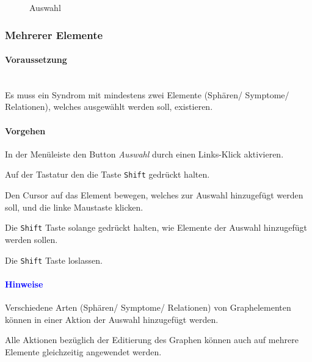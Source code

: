 \documentclass[enabledeprecatedfontcommands,fontsize=11pt,paper=a4,twoside]{scrartcl}
\newcounter{one}
\newcounter{two}[one]
\newcommand*{\hint}{\paragraph{\textcolor{blue}{Hinweise}}}
\newcommand*{\condition}{\paragraph{Voraussetzung}$\;$ \vspace{0.2cm}\\}
\newcommand*{\action}{\paragraph{Vorgehen}}
\let\tempone\itemize
\let\temptwo\enditemize
\renewenvironment{itemize}{\tempone\addtolength{\itemsep}{-10.0pt}}{\temptwo}
\let\origenumerate\enumerate
\let\origendenumerate\endenumerate
\renewenvironment{enumerate}{\origenumerate \addtolength{\itemsep}{-10.0pt}}{\origendenumerate}
\begin{document}
	\begin{figure}[ht!]
		\centering
		\caption{Auswahl}
		
	\end{figure}	

	
	
	\newpage
	\subsubsection{Mehrerer Elemente}
	\condition
	Es muss ein Syndrom mit mindestens zwei Elemente (Sphären/ Symptome/ Relationen), welches ausgewählt werden soll, existieren. 
	\action
	\begin{enumerate}
		\item In der Menüleiste den Button \textit{Auswahl} durch einen Links-Klick aktivieren. 
		\item Auf der Tastatur den die Taste \texttt{Shift} gedrückt halten. 
		\item Den Cursor auf das Element bewegen, welches zur Auswahl hinzugefügt werden soll, und die linke Maustaste klicken. 
		\item Die \texttt{Shift} Taste solange gedrückt halten, wie Elemente der Auswahl hinzugefügt werden sollen.
		\item Die \texttt{Shift} Taste loslassen.
	\end{enumerate}
	\hint
	\begin{itemize}
		\item Verschiedene Arten (Sphären/ Symptome/ Relationen) von Graphelementen können in einer Aktion der Auswahl hinzugefügt werden. 
		\item Alle Aktionen bezüglich der Editierung des Graphen können auch auf mehrere Elemente gleichzeitig angewendet werden. \\
	\end{itemize}
\end{document}
